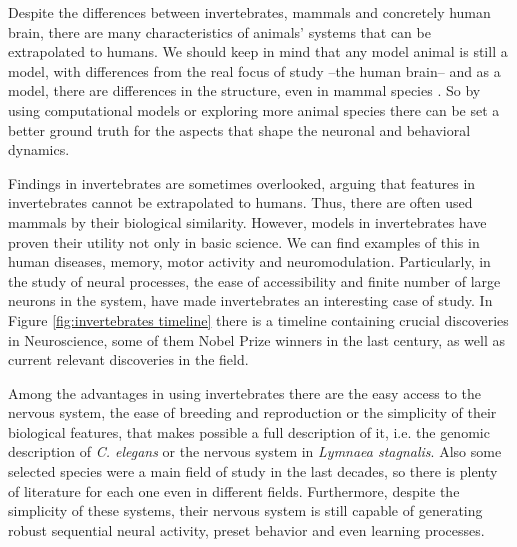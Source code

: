 Despite the differences between invertebrates, mammals and concretely human brain, there are many characteristics of animals' systems that can be extrapolated to humans. We should keep in mind that any model animal is still a model, with differences from the real focus of study --the human brain-- and as a model, there are differences in the structure, even in mammal species \parencite{preuss_taking_2000}. So by using computational models or exploring more animal species there can be set a better ground truth for the aspects that shape the neuronal and behavioral dynamics. 


Findings in invertebrates are sometimes overlooked, arguing that features in invertebrates cannot be extrapolated to humans. Thus, there are often used mammals by their biological similarity. However, models in invertebrates have proven their utility not only in basic science. We can find examples of this in human diseases, memory, motor activity and neuromodulation. Particularly, in the study of neural processes, the ease of accessibility and finite number of large neurons in the system, have made invertebrates an interesting case of study. In Figure \ref{fig:invertebrates timeline} there is a timeline containing crucial discoveries in Neuroscience, some of them Nobel Prize winners in the last century, as well as current relevant discoveries in the field. 

Among the advantages in using invertebrates there are the easy access to the nervous system, the ease of breeding and reproduction or the simplicity of their biological features, that makes possible a full description of it, i.e. the genomic description of \textit{C. elegans} or the nervous system in \textit{Lymnaea stagnalis}. Also some selected species were a main field of study in the last decades, so there is plenty of literature for each one even in different fields. Furthermore, despite the simplicity of these systems, their nervous system is still capable of generating robust sequential neural activity, preset behavior and even learning processes. 


